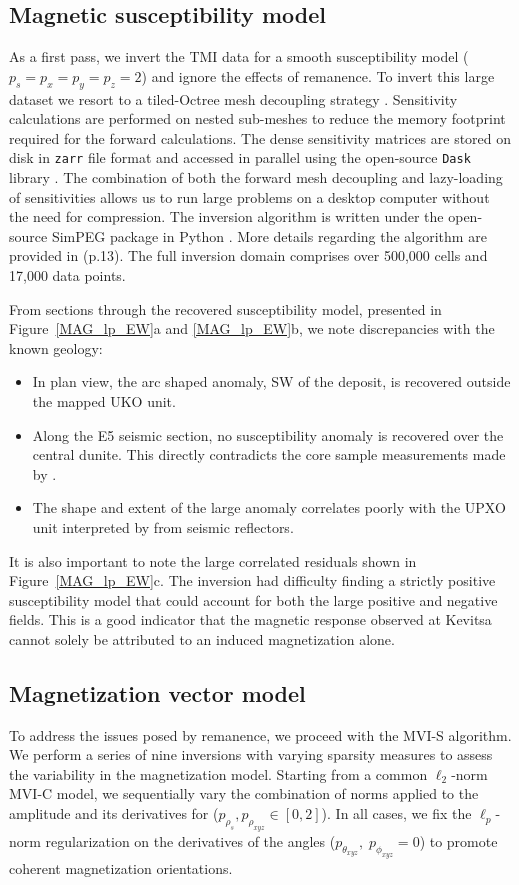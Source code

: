 \documentclass[paper]{geophysics}
\begin{document}
\subsection{Magnetic susceptibility model}
As a first pass, we invert the TMI data for a smooth susceptibility model ($p_s=p_x=p_y=p_z=2$) and ignore the effects of remanence.
To invert this large dataset we resort to a tiled-Octree mesh decoupling strategy \cite[]{Haber2014}. Sensitivity calculations are performed on nested sub-meshes to reduce the memory footprint required for the forward calculations. The dense sensitivity matrices are stored on disk in \texttt{zarr} file format and accessed in parallel using the open-source \texttt{Dask} library \cite[]{dask2016}. The combination of both the forward mesh decoupling and lazy-loading of sensitivities allows us to run large problems on a desktop computer without the need for compression. The inversion algorithm is written under the open-source SimPEG package in Python \cite[]{Cockett2015}. More details regarding the algorithm are provided in \cite{FournierPhD2019}(p.13). The full inversion domain comprises over 500,000 cells and 17,000 data points.

From sections through the recovered susceptibility model, presented in Figure~\ref{MAG_lp_EW}a and \ref{MAG_lp_EW}b, we note discrepancies with the known geology:
\begin{itemize}
\item In plan view, the arc shaped anomaly, SW of the deposit, is recovered outside the mapped UKO unit.
\item Along the E5 seismic section, no susceptibility anomaly is recovered over the central dunite. This  directly contradicts the core sample measurements made by \cite{Montonen2012}.
\item The shape and extent of the large anomaly correlates poorly with the UPXO unit interpreted by \cite{Koivisto2015} from seismic reflectors.
\end{itemize}
It is also important to note the large correlated residuals shown in Figure~\ref{MAG_lp_EW}c. The inversion had difficulty finding a strictly positive susceptibility model that could account for both the large positive and negative fields. This is a good indicator that the magnetic response observed at Kevitsa cannot solely be attributed to an induced magnetization alone.



\subsection{Magnetization vector model}
To address the issues posed by remanence, we proceed with the MVI-S algorithm.
We perform a series of nine inversions with varying sparsity measures to assess the variability in the magnetization model. Starting from a common $\ell_2$-norm MVI-C model, we sequentially vary the combination of norms applied to the amplitude and its derivatives for ($p_{\rho_s}, p_{\rho_{xyz}} \in [0, 2]$). In all cases, we fix the $\ell_p$-norm regularization on the derivatives of the angles ($p_{\theta_{xyz}},\;p_{\phi_{xyz}} =0$) to promote coherent magnetization orientations.
\end{document}
